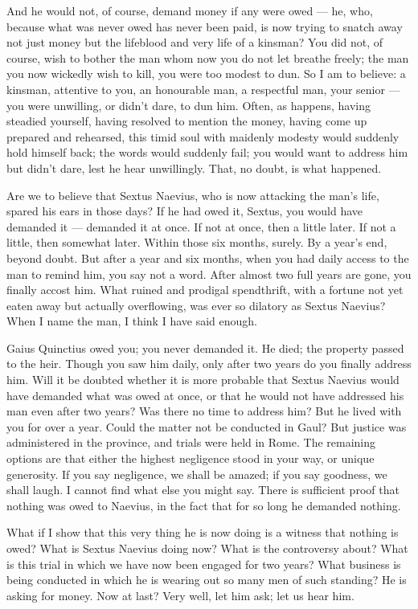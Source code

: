  And he would not, of course, demand money if any were owed --- he, who, because what was never owed has never been paid, is now trying to snatch away not just money but the lifeblood and very life of a kinsman? You did not, of course, wish to bother the man whom now you do not let breathe freely; the man you now wickedly wish to kill, you were too modest to dun. So I am to believe: a kinsman, attentive to you, an honourable man, a respectful man, your senior --- you were unwilling, or didn't dare, to dun him. Often, as happens, having steadied yourself, having resolved to mention the money, having come up prepared and rehearsed, this timid soul with maidenly modesty would suddenly hold himself back; the words would suddenly fail; you would want to address him but didn't dare, lest he hear unwillingly. That, no doubt, is what happened.

 Are we to believe that Sextus Naevius, who is now attacking the man's life, spared his ears in those days? If he had owed it, Sextus, you would have demanded it --- demanded it at once. If not at once, then a little later. If not a little, then somewhat later. Within those six months, surely. By a year's end, beyond doubt. But after a year and six months, when you had daily access to the man to remind him, you say not a word. After almost two full years are gone, you finally accost him. What ruined and prodigal spendthrift, with a fortune not yet eaten away but actually overflowing, was ever so dilatory as Sextus Naevius? When I name the man, I think I have said enough.

 Gaius Quinctius owed you; you never demanded it. He died; the property passed to the heir. Though you saw him daily, only after two years do you finally address him. Will it be doubted whether it is more probable that Sextus Naevius would have demanded what was owed at once, or that he would not have addressed his man even after two years? Was there no time to address him? But he lived with you for over a year. Could the matter not be conducted in Gaul? But justice was administered in the province, and trials were held in Rome. The remaining options are that either the highest negligence stood in your way, or unique generosity. If you say negligence, we shall be amazed; if you say goodness, we shall laugh. I cannot find what else you might say. There is sufficient proof that nothing was owed to Naevius, in the fact that for so long he demanded nothing.

 What if I show that this very thing he is now doing is a witness that nothing is owed? What is Sextus Naevius doing now? What is the controversy about? What is this trial in which we have now been engaged for two years? What business is being conducted in which he is wearing out so many men of such standing? He is asking for money. Now at last? Very well, let him ask; let us hear him.

